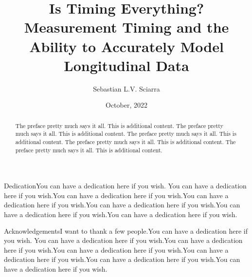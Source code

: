 \documentclass[
12pt, %
twoside,
english]{guelphthesis}
\title{Is Timing Everything? Measurement Timing and the Ability to Accurately Model Longitudinal Data}
\author{Sebastian L.V. Sciarra}
\date{October, 2022}
\let\oldfrontmatter\frontmatter
\renewcommand{\headrulewidth}{0pt}
\renewcommand{\frontmatter}{
  \oldfrontmatter
     \SetWatermarkLightness{0.8} %
  \SetWatermarkText{DRAFT}
  
  
   \pagestyle{frontmatter} %
}
\renewcommand{\headrulewidth}{0pt}
\begin{document}
\frontmatter %

  \maketitle

\setcounter{page}{2} %

\thispagestyle{empty} %
  \begin{abstract}{2}{The preface pretty much says it all. This is additional content. The preface pretty much says it all. This is additional content. The preface pretty much says it all. This is additional content. The preface pretty much says it all. This is additional content. The preface pretty much says it all. This is additional content.}  %

  \end{abstract}

  \begin{preambleItem}{2}{Dedication}{You can have a dedication here if you wish. You can have a dedication here if you wish.You can have a dedication here if you wish.You can have a dedication here if you wish.You can have a dedication here if you wish.You can have a dedication here if you wish.You can have a dedication here if you wish.}
  \end{preambleItem}
   \begin{preambleItem}{2}{Acknowledgements}{I want to thank a few people.You can have a dedication here if you wish. You can have a dedication here if you wish.You can have a dedication here if you wish.You can have a dedication here if you wish.You can have a dedication here if you wish.You can have a dedication here if you wish.You can have a dedication here if you wish.}
  \end{preambleItem}


\fancypagestyle{plain}{%
  \fancyhf{}%
  \renewcommand{\headrulewidth}{0pt}
  \fancyhead[R]{\thepage}

   }

  \hypersetup{linkcolor = black, pdfborder= 0 0 0} %
  \setcounter{secnumdepth}{5}
  \setcounter{tocdepth}{5}
  \tableofcontents
  \newpage
\end{document}
